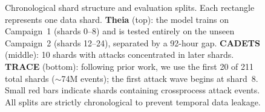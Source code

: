 \begin{figure}[t]
{%
}
\caption{Chronological shard structure and evaluation splits. Each rectangle represents one data shard. \textbf{Theia} (top): the model trains on Campaign~1 (shards 0--8) and is tested entirely on the unseen Campaign~2 (shards 12--24), separated by a 92-hour gap. \textbf{CADETS} (middle): 10 shards with attacks concentrated in later shards. \textbf{TRACE} (bottom): following prior work, we use the first 20 of 211 total shards ($\sim$74M events); the first attack wave begins at shard~8. Small red bars indicate shards containing crossprocess attack events. All splits are strictly chronological to prevent temporal data leakage.}
\label{fig:timeline}
\end{figure}
